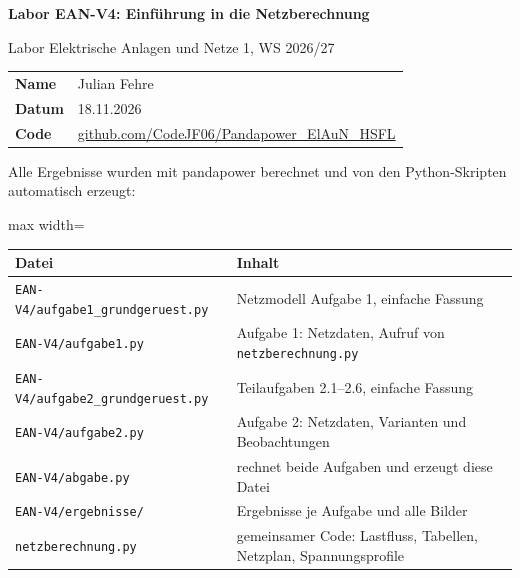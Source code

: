 \documentclass[11pt,a4paper]{article}
\begin{document}
\begin{titlepage}
\centering
\vspace*{3cm}
{\LARGE\bfseries Labor EAN-V4: Einführung in die Netzberechnung\par}
\vspace{1cm}
{\large Labor Elektrische Anlagen und Netze 1, WS 2026/27\par}
\vspace{2cm}
\begin{tabular}{ll}
\textbf{Name} & Julian Fehre \\
\textbf{Datum} & 18.11.2026 \\
\textbf{Code} & \href{https://github.com/CodeJF06/Pandapower_ElAuN_HSFL/tree/main/EAN-V4}{github.com/CodeJF06/Pandapower\_ElAuN\_HSFL} \\
\end{tabular}
\vfill
\end{titlepage}
\tableofcontents
\clearpage

Alle Ergebnisse wurden mit pandapower berechnet und von den Python-Skripten automatisch erzeugt:

\begin{table}[H]
\centering
\begin{adjustbox}{max width=\linewidth}
\begin{tabular}{>{\raggedright\arraybackslash}p{4.5cm}>{\raggedright\arraybackslash}p{4.5cm}}
\toprule
\textbf{Datei} & \textbf{Inhalt} \\
\midrule
\texttt{EAN-V4/\allowbreak{}aufgabe1\_\allowbreak{}grundgeruest.py} & Netzmodell Aufgabe 1, einfache Fassung \\
\texttt{EAN-V4/\allowbreak{}aufgabe1.py} & Aufgabe 1: Netzdaten, Aufruf von \texttt{netzberechnung.py} \\
\texttt{EAN-V4/\allowbreak{}aufgabe2\_\allowbreak{}grundgeruest.py} & Teilaufgaben 2.1–2.6, einfache Fassung \\
\texttt{EAN-V4/\allowbreak{}aufgabe2.py} & Aufgabe 2: Netzdaten, Varianten und Beobachtungen \\
\texttt{EAN-V4/\allowbreak{}abgabe.py} & rechnet beide Aufgaben und erzeugt diese Datei \\
\texttt{EAN-V4/\allowbreak{}ergebnisse/\allowbreak{}} & Ergebnisse je Aufgabe und alle Bilder \\
\texttt{netzberechnung.py} & gemeinsamer Code: Lastfluss, Tabellen, Netzplan, Spannungsprofile \\
\bottomrule
\end{tabular}
\end{adjustbox}
\end{table}
\end{document}
